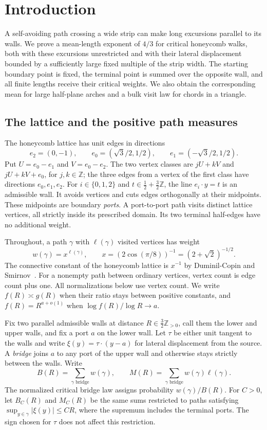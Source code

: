 \section{Introduction}

A self-avoiding path crossing a wide strip can make long excursions parallel
to its walls.  We prove a mean-length exponent of $4/3$ for critical honeycomb walks,
both with these excursions unrestricted and with their lateral displacement
bounded by a sufficiently large fixed multiple of the strip width.
The starting boundary point is fixed, the terminal point is summed over the
opposite wall, and all finite lengths receive their critical weights.  We
also obtain the corresponding mean for large half-plane arches and a bulk
visit law for chords in a triangle.

\subsection{The lattice and the positive path measures}
The honeycomb lattice has unit edges in directions
\[
 e_2=(0,-1),\qquad e_0=(\sqrt3/2,1/2),\qquad
 e_1=(-\sqrt3/2,1/2).
\]
Put $U=e_0-e_1$ and $V=e_0-e_2$.  The two vertex classes are
$jU+kV$ and $jU+kV+e_0$, for $j,k\in\mathbb Z$; the three edges from a
vertex of the first class have directions $e_0,e_1,e_2$.
For $i\in\{0,1,2\}$ and $t\in\frac12+\frac32\mathbb Z$, the line
$e_i\cdot y=t$ is an admissible wall.  It avoids vertices and cuts edges
orthogonally at their midpoints.  These midpoints are boundary \emph{ports}.  A port-to-port path visits distinct lattice vertices, all
strictly inside its prescribed domain.  Its two terminal half-edges have
no additional weight.

Throughout, a path $\gamma$ with $\ell(\gamma)$ visited vertices has weight
\[
 w(\gamma)=x^{\ell(\gamma)},\qquad
 x=(2\cos(\pi/8))^{-1}=(2+\sqrt2)^{-1/2}.
\]
The connective constant of the honeycomb lattice is $x^{-1}$ by
Duminil-Copin and Smirnov~\cite[Theorem~1]{DuminilCopinSmirnov2012}.
For a nonempty path between ordinary vertices, vertex count is edge count
plus one.  All normalizations below use vertex count.
We write $f(R)\asymp g(R)$ when their ratio stays between positive constants,
and $f(R)=R^{a+o(1)}$ when $\log f(R)/\log R\to a$.

Fix two parallel admissible walls at distance $R\in\frac32\mathbb Z_{>0}$,
call them the lower and upper walls, and fix a port $a$ on the lower wall.
Let $\tau$ be either unit tangent to the walls and write
$\xi(y)=\tau\cdot(y-a)$ for lateral displacement from the source.
A \emph{bridge} joins $a$ to any port of the upper wall and otherwise stays
strictly between the walls.  Write
\[
 B(R)=\sum_{\gamma\text{ bridge}}w(\gamma),\qquad
 M(R)=\sum_{\gamma\text{ bridge}}w(\gamma)\ell(\gamma).
\]
The normalized critical bridge law assigns probability $w(\gamma)/B(R)$.
For $C>0$, let $B_C(R)$ and $M_C(R)$ be the same sums restricted to paths
satisfying $\sup_{y\in\gamma}|\xi(y)|\le CR$, where the supremum includes
the terminal ports.  The sign chosen for $\tau$ does not affect this restriction.

